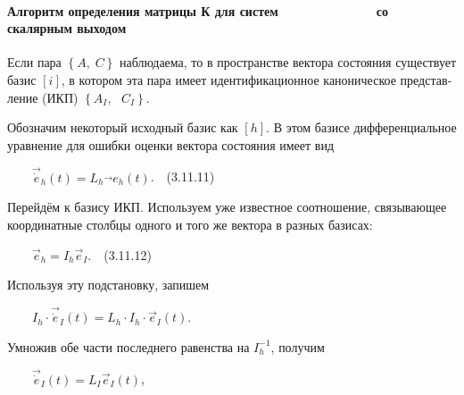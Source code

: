 \documentclass[a4paper]{article}
\begin{document}
\paragraph[Алгоритм определения матрицы К для систем \ \ \ \ \ \ \ \ \ \ \ \ \ со скалярным выходом ]{Алгоритм
определения матрицы \textup{К} для систем \ \ \ \ \ \ \ \ \ \ \ \ \ со скалярным выходом }

\bigskip

{\begin{russian}\sffamily
Если пара  $\left\{A,\;C\right\}$ наблюдаема, то в пространстве вектора состояния существует базис  $[i]$, в котором эта
пара имеет идентификационное ка­ноническое представление (ИКП)  $\left\{A_I,\text{  }C_I\right\}$.
\end{russian}}

{\begin{russian}\sffamily
Обозначим некоторый исходный базис как  $[h]$. В этом базисе дифференциальное уравнение для ошибки оценки вектора
состояния имеет вид
\end{russian}}

{\begin{russian}\sffamily
\ \ \ \  $\vec{\dot e}_h(t)=L_h\vec{}e_h(t)$.\ \ (3.11.11)
\end{russian}}

{\begin{russian}\sffamily
Перейдём к базису ИКП. Используем уже известное соотношение, связывающее координатные столбцы одного и того же вектора в
разных базисах:
\end{russian}}

{\begin{russian}\sffamily
\ \ \ \  $\vec e_h=I_h\vec e_I$.\ \ (3.11.12)
\end{russian}}

{\begin{russian}\sffamily
Используя эту подстановку, запишем
\end{russian}}

{\begin{russian}\sffamily
\ \ \ \  $I_h\cdot \vec{\dot e}_I(t)=L_h\cdot I_h\cdot \vec e_I(t)$.
\end{russian}}

{\begin{russian}\sffamily
Умножив обе части последнего равенства на  $I_h^{-1}$, получим
\end{russian}}

{\begin{russian}\sffamily
\ \ \ \  $\vec{\dot e}_I(t)=L_I\vec e_I(t)$,
\end{russian}}
\end{document}
